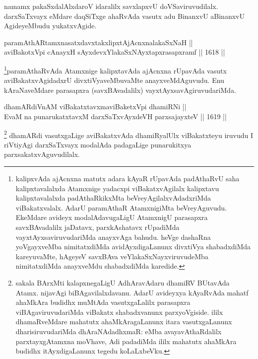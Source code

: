 \begin{artha}
namamx pakaSxdalAlxdaroV idaralilx savxlapxvU doVSaviruvudilalx. darxSaTxvayx eMdare daqSiTxge ahaRvAda vasutx adu BinanxvU aBinanxvU AgideyeMbudu yukatxvAgide.
\end{artha}


\begin{shl}
paramAthARtamxnasatxdavxtakxlipxtAjAcnxnalakaSxNaH ||  \\
aviBakotxV\s pi cAnayxH sAyxdevxYlakaSxNAyxtapxrasapxramf \hfill || 1618 ||  
\end{shl}

\begin{artha}
\footnote{kalipxvAda ajAcnxna matutx adara kAyaR rUpavAda padAthaRvU saha kalipxtavalalxda Atamxnige yadacxpi viBakatxvAgilalx kalipxtavu kalipxtavalalxda padAthaRkikxMta beVreyAgilalxvAdadxriMda viBakatxvalalx. AdarU paramAthaR AtamxnigiMta beVreyAguvudu. EkeMdare avideyx modalAdavugaLigU AtamxnigU parasapxra savxBAvadalilx jaDatavx, parxkAshatavx rUpadiMda vayxtAyxsaviruvudariMda anayxvAga bahudu. heVge dashaRna yoVgayxveMba nimitatxdiMda avidAyxdigaLanunx divxtiVya shabadxdiMda kareyuvaMte, hAgeyeV savxBAva veYlakaSxNayxviruvudeMba nimitatxdiMda anayxveMdu shabadxdiMda karedide.}paramAthaRvAda Atamxnige kalipxtavAda ajAcnxna rUpavAda vasutx aviBakatxvAgidadxrU divxtiVyaveMbuvaMte anayxveMdAguvudu. Enu kAraNaveMdare parasapxra (savxBAvadalilx) vayxtAyxsavAgiruvudariMda.
\end{artha}


\begin{shl}
dhamARdiVnAM viBakatxtavxmaviBaketxV\s pi dhamiRNi || \\
EvaM na punarukatxtavxM darxSaTxvAyxdeVH parxsajayxteV \hfill || 1619 ||  
\end{shl}

\begin{artha}
\footnote{sakala BArxMti kalapxnegaLigU AdhAravAdaru dhamiRV BUtavAda Atamx. nijavAgi biBAgavilalxdavanu. AdarU avideyxya kAyaRvAda mahatf ahaMkAra budidhx muMtAda vasutxgaLalilx parasapxra viBAgaviruvudariMda viBakatx shabadxvanunx parxyoVgiside. ililx dhamaRveMdare mahatutx ahaMkAragaLanunx itara vasutxgaLanunx dharisiruvudariMda dhAraNAdadhxmaR: eMba avayavAthaRdalilx parxtayxgAtamxna moVhave, Adi padadiMda ililx mahatutx ahaMkAra budidhx itAyxdigaLanunx tegedu koLaLxbeVku.}
dhamARdi vasutxgaLige aviBakatxvAda dhamiRyalUlx viBakatxteyu iruvudu I riVtiyAgi darxSaTxvayx modalAda padagaLige punarukitxya parxsakatxvAguvudilalx.
\end{artha}

